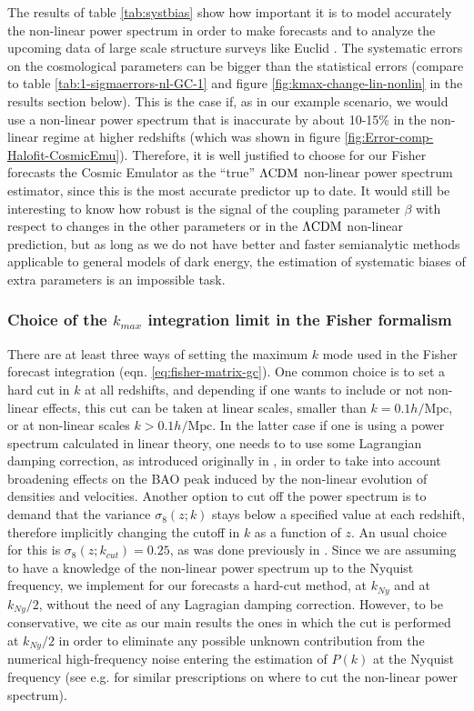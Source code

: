 The results of table \ref{tab:systbias} show how important it is
to model accurately the non-linear power spectrum in order to make
forecasts and to analyze the upcoming data of large scale structure
surveys like Euclid \cite{amendola_cosmology_2012-short}. The systematic
errors on the cosmological parameters can be bigger than the statistical
errors (compare to table \ref{tab:1-sigmaerrors-nl-GC-1} and figure
\ref{fig:kmax-change-lin-nonlin} in the results section below). This
is the case if, as in our example scenario, we would use a non-linear
power spectrum that is inaccurate by about 10-15\% in the non-linear
regime at higher redshifts (which was shown in figure \ref{fig:Error-comp-Halofit-CosmicEmu}).
Therefore, it is well justified to choose for our Fisher forecasts
the Cosmic Emulator as the ``true'' $\Lambda\mathrm{CDM}$ non-linear power spectrum
estimator, since this is the most accurate predictor up to date. It
would still be interesting to know how robust is the signal of the
coupling parameter $\beta$ with respect to changes in the other parameters
or in the $\Lambda\mathrm{CDM}$ non-linear prediction, but as long as we do not
have better and faster semianalytic methods applicable to general
models of dark energy, the estimation of systematic biases of extra
parameters is an impossible task.


\subsubsection{Choice of the $k_{max}$ integration limit in the Fisher formalism}

There are at least three ways of setting the maximum $k$ mode used
in the Fisher forecast integration (eqn. \ref{eq:fisher-matrix-gc}).
One common choice is to set a hard cut in $k$ at all redshifts, and
depending if one wants to include or not non-linear effects, this
cut can be taken at linear scales, smaller than $k=0.1h/\mbox{Mpc}$,
or at non-linear scales $k>0.1h/\mbox{Mpc}$. In the latter case if
one is using a power spectrum calculated in linear theory, one needs
to to use some Lagrangian damping correction, as introduced originally
in \cite{seo2007improved,seo_nonlinear_2008}, in order to take into
account broadening effects on the BAO peak induced by the non-linear
evolution of densities and velocities. Another option to cut off the
power spectrum is to demand that the variance $\sigma_{8}(z;k)$ stays
below a specified value at each redshift, therefore implicitly changing
the cutoff in $k$ as a function of $z$. An usual choice for this
is $\sigma_{8}(z;k_{cut})=0.25$, as was done previously in \cite{amendola_testing_2012}.
Since we are assuming to have a knowledge of the non-linear power
spectrum up to the Nyquist frequency, we implement for our forecasts
a hard-cut method, at $k_{Ny}$ and at $k_{Ny}/2$, without the need
of any Lagragian damping correction. However, to be conservative,
we cite as our main results the ones in which the cut is performed
at $k_{Ny}/2$ in order to eliminate any possible unknown contribution
from the numerical high-frequency noise entering the estimation of
$P(k)$ at the Nyquist frequency (see e.g. \cite{colombi_accurate_2009,Fosalba2013}
for similar prescriptions on where to cut the non-linear power spectrum)\textcolor{black}{.}


